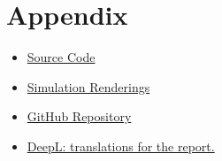 \documentclass[a4paper,12pt]{article}
\begin{document}
\newpage
\printbibliography

\section*{Appendix}
\begin{itemize}
    \item \href{https://colab.research.google.com/github/paulmyr/DD2365-AdvancedCFD/blob/master/project/template-report-Navier-Stokes.ipynb#scrollTo=W-bCOI6LuxFi}{Source Code}
    \item \href{https://github.com/paulmyr/DD2365-AdvancedCFD/tree/master/project/presentation/vid}{Simulation Renderings}
    \item \href{https://github.com/paulmyr/DD2365-AdvancedCFD/tree/master/project}{GitHub Repository}
    \item \href{https://www.deepl.com/de/translator}{DeepL: translations for the report.}
\end{itemize}
\end{document}
